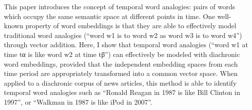 This paper introduces the concept of temporal word analogies: pairs of words which occupy the same semantic space at different points in time. One well-known property of word embeddings is that they are able to effectively model traditional word analogies (``word w1 is to word w2 as word w3 is to word w4'') through vector addition. Here, I show that temporal word analogies (``word w1 at time tα is like word w2 at time tβ'') can effectively be modeled with diachronic word embeddings, provided that the independent embedding spaces from each time period are appropriately transformed into a common vector space. When applied to a diachronic corpus of news articles, this method is able to identify temporal word analogies such as ``Ronald Reagan in 1987 is like Bill Clinton in 1997'', or ``Walkman in 1987 is like iPod in 2007''.
